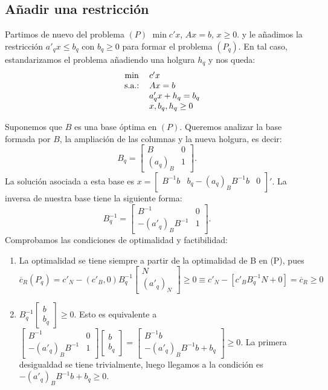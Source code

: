 \documentclass[PM.tex]{subfiles}
\begin{document}
\subsection{Añadir una restricción}
Partimos de nuevo del problema $(P)$ $\min c'x$, $Ax=b$, $x\geq 0$. y le añadimos la restricción $a'_q x\leq b_q$ con $b_q \geq 0$ para formar el problema $(P_q)$. En tal caso, estandarizamos el problema añadiendo una holgura $h_q$ y nos queda:
\[\begin{tabular}{c c l}
	& $\min$ & $c'x$\\
	& s.a.: & $Ax=b$\\
	& & $a'_q x + h_q = b_q$\\
    & & $x, b_q, h_q\geq 0$
\end{tabular}
\]

Suponemos que $B$ es una base óptima en $(P)$. Queremos analizar la base formada por $B$, la ampliación de las columnas y la nueva holgura, es decir:
\[ B_q=\begin{bmatrix}
B & 0\\
(a_q)_B & 1
\end{bmatrix}.\]
La solución asociada a esta base es $x=
\begin{bmatrix}
B^{-1}b & b_q-(a_q)_B B^{-1}b & 0\end{bmatrix}'$. La inversa de nuestra base tiene la siguiente forma:
\[ B_q^{-1}=\begin{bmatrix}
B^{-1} & 0\\
-(a'_q)_B B^{-1} & 1
\end{bmatrix}.\]
Comprobamos las condiciones de optimalidad y factibilidad:
\begin{enumerate}
\item La optimalidad se tiene siempre a partir de la optimalidad de B en (P), pues
\[\overline{c}_R(P_q)=c'_N-(c'_B,0)B_q^{-1}\begin{bmatrix}
N\\
(a'_q)_N
\end{bmatrix}\geq 0 \equiv c'_N-[c'_B B_q^{-1} N + 0]=\overline{c}_R\geq 0\]
\item $B_q^{-1}\begin{bmatrix}
b\\
b_q
\end{bmatrix}\geq 0$. Esto es equivalente a $\begin{bmatrix}
B^{-1} & 0\\
-(a'_q)_B B^{-1} & 1
\end{bmatrix}\begin{bmatrix}
b\\
b_q
\end{bmatrix}=\begin{bmatrix}
B^{-1}b\\
-(a'_q)_B B^{-1}b+b_q
\end{bmatrix}\geq 0$. La primera desigualdad se tiene trivialmente, luego llegamos a la condición es $-(a'_q)_B B^{-1}b+b_q\geq 0$.
\end{enumerate}
\end{document}
